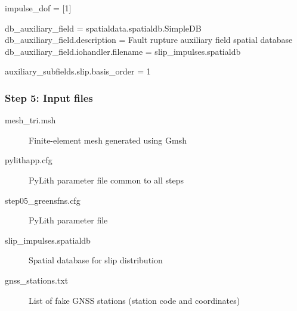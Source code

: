 \documentclass[aspectratio=169]{beamer}
\begin{document}
\begin{frame}[t,fragile]
\begin{minipage}[t]{0.60\textwidth}
\begin{onlyenv}
\begin{cfgcode}
        impulse_dof = [1]

        db_auxiliary_field = spatialdata.spatialdb.SimpleDB
        db_auxiliary_field.description = Fault rupture auxiliary field spatial database
        db_auxiliary_field.iohandler.filename = slip_impulses.spatialdb

        auxiliary_subfields.slip.basis_order = 1
      \end{cfgcode}
    \end{onlyenv}
  \end{minipage}

  
\end{frame}


\begin{frame}
  \frametitle{Step 5: Input files}
  \summary{}

  \begin{description}
  \item[mesh\_tri.msh] Finite-element mesh generated using Gmsh
  \item[pylithapp.cfg] PyLith parameter file common to all steps
  \item[step05\_greensfns.cfg] PyLith parameter file
  \item[slip\_impulses.spatialdb] Spatial database for slip distribution
  \item[gnss\_stations.txt] List of fake GNSS stations (station code and coordinates)
  \end{description}
    
\end{frame}
\end{document}
